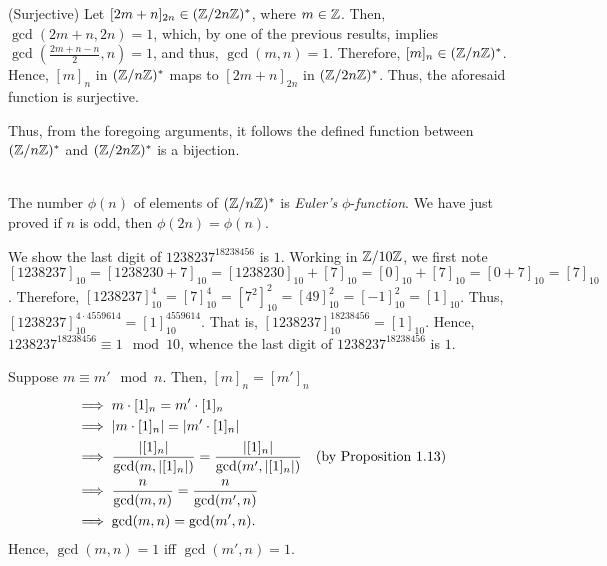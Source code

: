 \begin{xca}
\begin{itemize}
(Surjective) Let $[2m + n]_{2n} \in (\mathbb{Z}/{2n\mathbb{Z}})^*$, where $m \in \mathbb{Z}$. Then,
$\gcd(2m + n, 2n) = 1$, which, by one of the previous results, implies
$\gcd(\frac{2m + n - n}{2}, n) = 1$, and thus, $\gcd(m, n) = 1$. Therefore,
$[m]_n \in (\mathbb{Z}/{n\mathbb{Z}})^*$. Hence, $[m]_n$ in $(\mathbb{Z}/{n\mathbb{Z}})^*$ maps to
$[2m + n]_{2n}$ in $(\mathbb{Z}/{2n\mathbb{Z}})^*$. Thus, the aforesaid function is surjective.

Thus, from the foregoing arguments, it follows the defined function between
$(\mathbb{Z}/{n\mathbb{Z}})^*$ and $(\mathbb{Z}/{2n\mathbb{Z}})^*$ is a bijection.

~\\
The number $\phi(n)$ of elements of $(\mathbb{Z}/{n\mathbb{Z}})^*$ is \emph{Euler's}
$\phi$-\emph{function}. We have just proved if $n$ is odd, then $\phi(2n) =
\phi(n)$.
\end{itemize}
\end{xca}

\begin{xca}
We show the last digit of $1238237^{18238456}$ is $1$. Working in $\mathbb{Z}/{10\mathbb{Z}}$,
we first note $[1238237]_{10} = [1238230 + 7]_{10} = [1238230]_{10} + [7]_{10}
= [0]_{10} + [7]_{10} = [0 + 7]_{10} = [7]_{10}$. Therefore, $[1238237]_{10}^4
= [7]_{10}^4 = [7^2]_{10}^2 = [49]_{10}^2 = [-1]_{10}^2 = [1]_{10}$. Thus,
$[1238237]_{10}^{4 \cdot 4559614} = [1]_{10}^{4559614}$. That is,
$[1238237]_{10}^{18238456} = [1]_{10}$. Hence, $1238237^{18238456} \equiv 1
\mod 10$, whence the last digit of $1238237^{18238456}$ is $1$.
\end{xca}

\begin{xca}
Suppose $m \equiv m' \mod n$. Then, $[m]_n = [m']_n$
\begin{align*}
&\implies m \cdot [1]_n = m' \cdot [1]_n \\
&\implies |m \cdot [1]_n| = |m' \cdot [1]_n| \\
&\implies \frac{|[1]_n|}{\gcd(m, |[1]_n|)} = \frac{|[1]_n|}{\gcd(m', |[1]_n|)}
\quad (\text{by Proposition 1.13}) \\
&\implies \frac{n}{\gcd(m, n)} = \frac{n}{\gcd(m', n)} \\
&\implies \gcd(m, n) = \gcd(m', n).
\end{align*}
Hence, $\gcd(m, n) = 1$ iff $\gcd(m', n) = 1$.
\end{xca}
